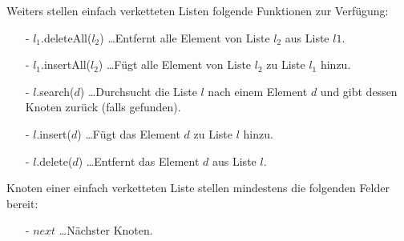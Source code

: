 \documentclass{article}
\begin{document}
\noindent
Weiters stellen einfach verketteten Listen folgende Funktionen zur Verf{\"u}gung:
\begin{itemize}
  \item[-] $l_1$.deleteAll($l_2$) \ldots Entfernt alle Element von Liste $l_2$ aus
    Liste $l1$.
  \item[-] $l_1$.insertAll($l_2$) \ldots F{\"u}gt alle Element von Liste $l_2$ zu
    Liste $l_1$ hinzu.
  \item[-] $l$.search($d$) \ldots Durchsucht die Liste $l$ nach einem Element $d$
    und gibt dessen Knoten zur{\"u}ck (falls gefunden).
  \item[-] $l$.insert($d$) \ldots F{\"u}gt das Element $d$ zu Liste $l$ hinzu.
  \item[-] $l$.delete($d$) \ldots Entfernt das Element $d$ aus Liste $l$.
\end{itemize}
%
Knoten einer einfach verketteten Liste stellen mindestens die folgenden Felder
bereit:
\begin{itemize}
  \item[-] $next$ \ldots N{\"a}chster Knoten.
\end{itemize}
%
\end{document}
